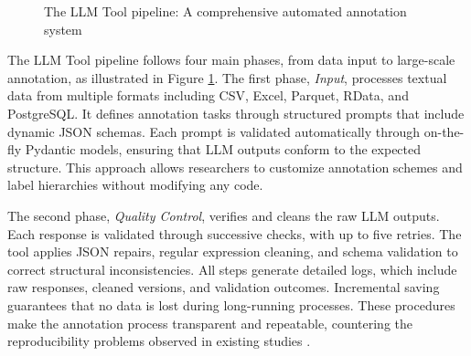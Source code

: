 \documentclass[12pt]{article}
\begin{document}
\begin{figure}[b!]
%
\caption{The LLM Tool pipeline: A comprehensive automated annotation system}
\label{fig:llm_tool_concept}
\end{figure}

The LLM Tool pipeline follows four main phases, from data input to large-scale annotation, as illustrated in Figure \ref{fig:llm_tool_concept}. The first phase, \emph{Input}, processes textual data from multiple formats including CSV, Excel, Parquet, RData, and PostgreSQL. It defines annotation tasks through structured prompts that include dynamic JSON schemas. Each prompt is validated automatically through on-the-fly Pydantic models, ensuring that LLM outputs conform to the expected structure. This approach allows researchers to customize annotation schemes and label hierarchies without modifying any code. 

The second phase, \emph{Quality Control}, verifies and cleans the raw LLM outputs. Each response is validated through successive checks, with up to five retries. The tool applies JSON repairs, regular expression cleaning, and schema validation to correct structural inconsistencies. All steps generate detailed logs, which include raw responses, cleaned versions, and validation outcomes. Incremental saving guarantees that no data is lost during long-running processes. These procedures make the annotation process transparent and repeatable, countering the reproducibility problems observed in existing studies \parencite{chen_etal23, weber_reichardt23, zhao_etal24}.
\end{document}
